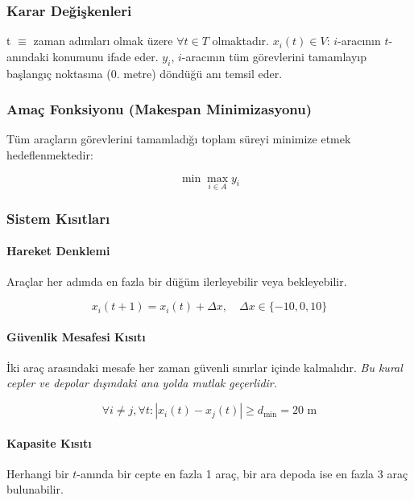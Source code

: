 \subsubsection{Karar Değişkenleri}

t $\equiv$ zaman adımları olmak üzere $\forall t \in T$ olmaktadır. $x_i(t) \in V$: $i$-aracının $t$-anındaki konumunu ifade eder. $y_i$, $i$-aracının tüm görevlerini tamamlayıp başlangıç noktasına (0. metre) döndüğü anı temsil eder.

\subsubsection{Amaç Fonksiyonu (Makespan Minimizasyonu)}

Tüm araçların görevlerini tamamladığı toplam süreyi minimize etmek hedeflenmektedir:

\begin{equation}
    \min \max_{i \in A} y_i
\end{equation}

\subsubsection{Sistem Kısıtları} \label{sec:sistem-kısıtları}

\paragraph{Hareket Denklemi} Araçlar her adımda en fazla bir düğüm ilerleyebilir veya bekleyebilir.

\begin{equation}
    x_i(t+1) = x_i(t) + \Delta x, \quad \Delta x \in \{-10, 0, 10\}
\end{equation}

\paragraph{Güvenlik Mesafesi Kısıtı} İki araç arasındaki mesafe her zaman güvenli sınırlar içinde kalmalıdır. \textit{Bu kural cepler ve depolar dışındaki ana yolda mutlak geçerlidir.}

\begin{equation}
    \forall i \neq j, \forall t: |x_i(t) - x_j(t)| \ge d_{\text{min}} = 20 \text{ m}
\end{equation}
 
\paragraph{Kapasite Kısıtı} Herhangi bir $t$-anında bir cepte en fazla 1 araç, bir ara depoda ise en fazla 3 araç bulunabilir.

